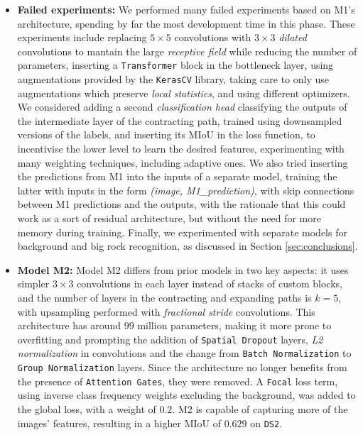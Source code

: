 \documentclass[11pt]{article}
\begin{document}
\begin{multicols}{2}
\begin{itemize}[leftmargin=*]
            \item \textbf{Failed experiments:} We performed many failed experiments based on M1's architecture, spending by far the most development time in this phase. These experiments include replacing $5\times5$ convolutions with $3\times3$ \textit{dilated} convolutions to mantain the large \textit{receptive field} while reducing the number of parameters, inserting a \texttt{Transformer}\cite{vaswani2023attentionneed} block in the bottleneck layer, using augmentations provided by the \texttt{KerasCV}\cite{chollet2015keras} library, taking care to only use augmentations which preserve \textit{local statistics}, and using different optimizers. We considered adding a second \textit{classification head} classifying the outputs of the intermediate layer of the contracting path, trained using downsampled versions of the labels, and inserting its MIoU in the loss function, to incentivise the lower level to learn the desired features, experimenting with many weighting techniques, including adaptive ones. We also tried inserting the predictions from M1 into the inputs of a separate model, training the latter with inputs in the form \textit{(image, M1\_prediction)}, with skip connections between M1 predictions and the outputs, with the rationale that this could work as a sort of residual architecture, but without the need for more memory during training. Finally, we experimented with separate models for background and big rock recognition, as discussed in Section \ref{sec:conclusions}.
            \item \textbf{Model M2:} Model M2 differs from prior models in two key aspects: it uses simpler $3\times3$ convolutions in each layer instead of stacks of custom blocks, and the number of layers in the contracting and expanding paths is $k=5$, with upsampling performed with \textit{fractional stride} convolutions. This architecture has around $99$ million parameters, making it more prone to overfitting and prompting the addition of \texttt{Spatial Dropout} layers, \textit{L2 normalization} in convolutions and the change from \texttt{Batch Normalization} to \texttt{Group Normalization} layers. Since the architecture no longer benefits from the presence of \texttt{Attention Gates}, they were removed. A \texttt{Focal}\cite{lin2018focallossdenseobject} loss term, using inverse class frequency weights excluding the background, was added to the global loss, with a weight of $0.2$. M2 is capable of capturing more of the images' features, resulting in a higher MIoU of $0.629$ on \texttt{DS2}.
      \end{itemize}


\end{multicols}
\end{document}
